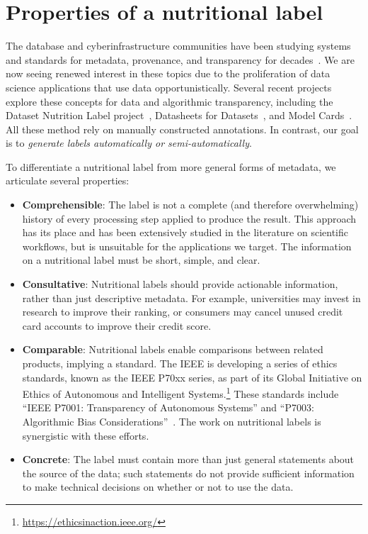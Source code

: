 \section{Properties of a nutritional label}
\label{sec:prop}

The database and cyberinfrastructure communities have been studying systems and standards for metadata, provenance, and transparency for decades~\cite{op,DBLP:journals/concurrency/MoreauLA08}. We are now seeing renewed interest in these topics due to the proliferation of data science applications that use data opportunistically.  Several recent projects explore these concepts for data and algorithmic transparency, including the Dataset Nutrition Label project~\cite{DBLP:journals/corr/abs-1805-03677}, Datasheets for Datasets~\cite{DBLP:journals/corr/abs-1803-09010}, and Model Cards~\cite{DBLP:conf/fat/MitchellWZBVHSR19}. 
All these method rely on manually constructed annotations.  In contrast, our goal is to {\em generate labels automatically or semi-automatically}.

To differentiate a nutritional label from more general forms of metadata, we articulate several properties:
\begin{itemize}
\item {\bf Comprehensible}: The label is not a complete (and therefore overwhelming) history of every processing step applied to produce the result.  This approach has its place and has been extensively studied in the literature on scientific workflows, but is unsuitable for the applications we target.  The information on a nutritional label must be short, simple, and clear.

\item {\bf Consultative}: Nutritional labels should provide actionable information, rather than just descriptive metadata.  For example, universities may invest in research to improve their ranking, or consumers may cancel unused credit card accounts to improve their credit score.

\item {\bf Comparable}: Nutritional labels enable comparisons between related products, implying a standard. %
The IEEE is developing a series of ethics standards, known as the  IEEE P70xx series, as part of its Global Initiative on Ethics of Autonomous and Intelligent Systems.\footnote{\url{https://ethicsinaction.ieee.org/}}  These  standards include ``IEEE P7001: Transparency of Autonomous Systems'' and  ``P7003: Algorithmic Bias Considerations''~\cite{DBLP:conf/icse/KoeneDS18}.  The work on nutritional labels is synergistic with these efforts.

\item {\bf Concrete}: The label must contain more than just general statements about the source of the data; such statements do not provide sufficient information to make technical decisions on whether or not to use the data.  
\end{itemize}
 

